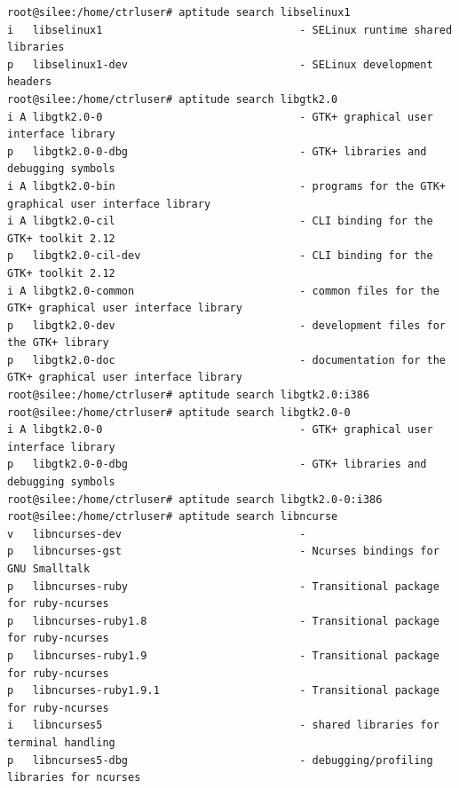 \documentclass[11pt
  , a4paper
  , article
  , oneside
]{memoir}
\begin{document}
\begin{lstlisting}[style=termstyle]
root@silee:/home/ctrluser# aptitude search libselinux1
i   libselinux1                               - SELinux runtime shared libraries                                   
p   libselinux1-dev                           - SELinux development headers                                        
root@silee:/home/ctrluser# aptitude search libgtk2.0
i A libgtk2.0-0                               - GTK+ graphical user interface library                              
p   libgtk2.0-0-dbg                           - GTK+ libraries and debugging symbols                               
i A libgtk2.0-bin                             - programs for the GTK+ graphical user interface library             
i A libgtk2.0-cil                             - CLI binding for the GTK+ toolkit 2.12                              
p   libgtk2.0-cil-dev                         - CLI binding for the GTK+ toolkit 2.12                              
i A libgtk2.0-common                          - common files for the GTK+ graphical user interface library         
p   libgtk2.0-dev                             - development files for the GTK+ library                             
p   libgtk2.0-doc                             - documentation for the GTK+ graphical user interface library        
root@silee:/home/ctrluser# aptitude search libgtk2.0:i386
root@silee:/home/ctrluser# aptitude search libgtk2.0-0
i A libgtk2.0-0                               - GTK+ graphical user interface library                              
p   libgtk2.0-0-dbg                           - GTK+ libraries and debugging symbols                               
root@silee:/home/ctrluser# aptitude search libgtk2.0-0:i386
root@silee:/home/ctrluser# aptitude search libncurse
v   libncurses-dev                            -                                                                    
p   libncurses-gst                            - Ncurses bindings for GNU Smalltalk                                 
p   libncurses-ruby                           - Transitional package for ruby-ncurses                              
p   libncurses-ruby1.8                        - Transitional package for ruby-ncurses                              
p   libncurses-ruby1.9                        - Transitional package for ruby-ncurses                              
p   libncurses-ruby1.9.1                      - Transitional package for ruby-ncurses                              
i   libncurses5                               - shared libraries for terminal handling                             
p   libncurses5-dbg                           - debugging/profiling libraries for ncurses                          

\end{lstlisting}
\end{document}

